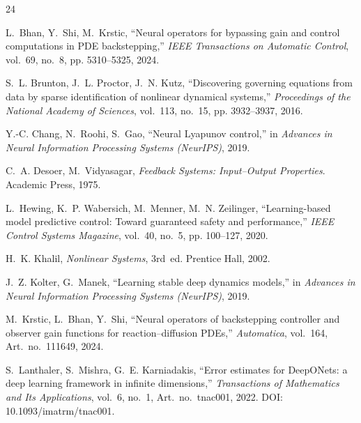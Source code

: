 \documentclass[11pt]{article}
\begin{document}
\begin{thebibliography}{24}

L.~Bhan, Y.~Shi, M.~Krstic,
``Neural operators for bypassing gain and control computations in PDE
backstepping,''
\emph{IEEE Transactions on Automatic Control}, vol.~69, no.~8,
pp. 5310--5325, 2024.

S.~L. Brunton, J.~L. Proctor, J.~N. Kutz,
``Discovering governing equations from data by sparse identification of
nonlinear dynamical systems,''
\emph{Proceedings of the National Academy of Sciences}, vol.~113, no.~15,
pp. 3932--3937, 2016.

Y.-C. Chang, N.~Roohi, S.~Gao,
``Neural Lyapunov control,''
in \emph{Advances in Neural Information Processing Systems (NeurIPS)}, 2019.

C.~A. Desoer, M.~Vidyasagar,
\emph{Feedback Systems: Input--Output Properties}. Academic Press, 1975.

L.~Hewing, K.~P. Wabersich, M.~Menner, M.~N. Zeilinger,
``Learning-based model predictive control: Toward guaranteed safety and
performance,''
\emph{IEEE Control Systems Magazine}, vol.~40, no.~5, pp. 100--127, 2020.

H.~K. Khalil, \emph{Nonlinear Systems}, 3rd~ed. Prentice Hall, 2002.

J.~Z. Kolter, G.~Manek,
``Learning stable deep dynamics models,''
in \emph{Advances in Neural Information Processing Systems (NeurIPS)}, 2019.

M.~Krstic, L.~Bhan, Y.~Shi,
``Neural operators of backstepping controller and observer gain functions
for reaction--diffusion PDEs,''
\emph{Automatica}, vol.~164, Art.\ no.\ 111649, 2024.

S.~Lanthaler, S.~Mishra, G.~E. Karniadakis,
``Error estimates for DeepONets: a deep learning framework in infinite
dimensions,''
\emph{Transactions of Mathematics and Its Applications}, vol.~6, no.~1,
Art.\ no.\ tnac001, 2022. DOI: 10.1093/imatrm/tnac001.


\end{thebibliography}
\end{document}

